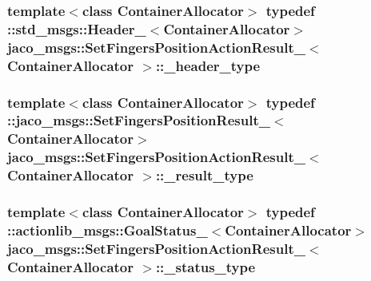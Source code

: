 \subsubsection[{\texorpdfstring{\+\_\+header\+\_\+type}{_header_type}}]{\setlength{\rightskip}{0pt plus 5cm}template$<$class Container\+Allocator$>$ typedef \+::std\+\_\+msgs\+::\+Header\+\_\+$<$Container\+Allocator$>$ {\bf jaco\+\_\+msgs\+::\+Set\+Fingers\+Position\+Action\+Result\+\_\+}$<$ Container\+Allocator $>$\+::{\bf \+\_\+header\+\_\+type}}\hypertarget{structjaco__msgs_1_1SetFingersPositionActionResult___adafecfdd9d7d042f35c88e4c41aa2b4f}{}\label{structjaco__msgs_1_1SetFingersPositionActionResult___adafecfdd9d7d042f35c88e4c41aa2b4f}
\subsubsection[{\texorpdfstring{\+\_\+result\+\_\+type}{_result_type}}]{\setlength{\rightskip}{0pt plus 5cm}template$<$class Container\+Allocator$>$ typedef \+::{\bf jaco\+\_\+msgs\+::\+Set\+Fingers\+Position\+Result\+\_\+}$<$Container\+Allocator$>$ {\bf jaco\+\_\+msgs\+::\+Set\+Fingers\+Position\+Action\+Result\+\_\+}$<$ Container\+Allocator $>$\+::{\bf \+\_\+result\+\_\+type}}\hypertarget{structjaco__msgs_1_1SetFingersPositionActionResult___a0afeedf3b25e89762f7afc0636d21640}{}\label{structjaco__msgs_1_1SetFingersPositionActionResult___a0afeedf3b25e89762f7afc0636d21640}
\subsubsection[{\texorpdfstring{\+\_\+status\+\_\+type}{_status_type}}]{\setlength{\rightskip}{0pt plus 5cm}template$<$class Container\+Allocator$>$ typedef \+::actionlib\+\_\+msgs\+::\+Goal\+Status\+\_\+$<$Container\+Allocator$>$ {\bf jaco\+\_\+msgs\+::\+Set\+Fingers\+Position\+Action\+Result\+\_\+}$<$ Container\+Allocator $>$\+::{\bf \+\_\+status\+\_\+type}}\hypertarget{structjaco__msgs_1_1SetFingersPositionActionResult___ac4ef0553517c5a84f08a672d3b0d2c9f}{}\label{structjaco__msgs_1_1SetFingersPositionActionResult___ac4ef0553517c5a84f08a672d3b0d2c9f}
